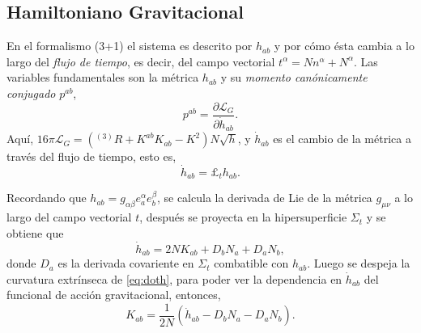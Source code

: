 
\subsection{Hamiltoniano Gravitacional}

En el formalismo (3+1) el sistema es descrito por $h_{ab}$ y por c\'{o}mo \'{e}sta cambia a lo largo del \emph{flujo de tiempo}, es decir, del campo vectorial $t^{\alpha} = N n^{\alpha} + N^{\alpha}$. Las variables fundamentales son la m\'{e}trica $h_{ab}$ y su \emph{momento can\'{o}nicamente conjugado} $p^{ab}$,
%
\begin{equation}
p^{ab} = \frac{\partial \mathcal{L}_{G}}{\partial \dot{h}_{ab}}.
\end{equation}
%
Aqu\'{i}, $16 \pi \mathcal{L}_{G} = (^{(3)}R + K^{ab} K_{ab} - K^{2}) N \sqrt{h}$, y $\dot{h}_{ab}$ es el cambio de la m\'{e}trica a trav\'{e}s del flujo de tiempo, esto es,
%
\begin{equation}
\dot{h}_{ab} = \pounds_{t} h_{ab}.
\end{equation}

Recordando que $h_{ab} = g_{\alpha \beta} e^{\alpha}_{a} e^{\beta}_{b}$, se calcula la derivada de Lie de la m\'{e}trica $g_{\mu \nu}$ a lo largo del campo vectorial $t$, despu\'{e}s se proyecta en la hipersuperficie $\Sigma_{t}$ y se obtiene que
%
\begin{equation}
\label{eq:doth}
\dot{h}_{ab} = 2 N K_{ab} + D_{b} N_{a} + D_{a} N_{b},
\end{equation}
%
donde $D_{a}$ es la derivada covariente en $\Sigma_{t}$ combatible con $h_{ab}$.
%
%
Luego se despeja la curvatura extr\'{i}nseca de \eqref{eq:doth}, para poder ver la dependencia en $\dot{h}_{ab}$ del funcional de acci\'{o}n gravitacional, entonces,
%
\begin{equation}
\label{eq:Kab(doth)}
K_{ab} = \frac{1}{2 N} \left( \dot{h}_{ab} - D_{b} N_{a} - D_{a} N_{b} \right).
\end{equation}

